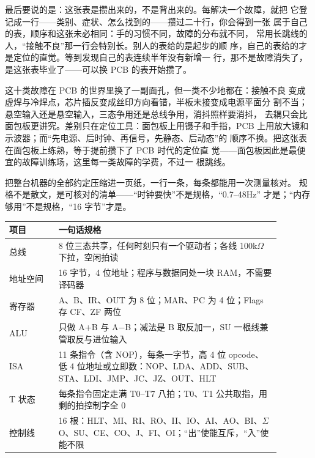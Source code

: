 最后要说的是：这张表是攒出来的，不是背出来的。每解决一个故障，就把
它登记成一行——类别、症状、怎么找到的——攒过二十行，你会得到一张
属于自己的表，顺序和这张未必相同：手的习惯不同，故障的分布就不同，
常用长跳线的人，“接触不良”那一行会特别长。别人的表给的是起步的顺
序，自己的表给的才是定位的直觉。等到发现自己的表连续半年没有新增一
行，那不是故障消失了，是这张表毕业了——可以换 PCB 的表开始攒了。

这十类故障在 PCB 的世界里换了一副面孔，但一类不少地都在：接触不良
变成虚焊与冷焊点，芯片插反变成丝印方向看错，半板未接变成电源平面分
割不当；悬空输入还是悬空输入，三态争用还是总线争用，消抖照样要消抖，
去耦只会比面包板更讲究。差别只在定位工具：面包板上用镊子和手指，PCB
上用放大镜和示波器；而“先电源、后时钟、再信号，先静态、后动态”的
顺序不换。把这张表在面包板上练熟，等于提前攒下了 PCB 时代的定位直
觉——面包板因此是最便宜的故障训练场，这里每一类故障的学费，不过一
根跳线。

把整台机器的全部约定压缩进一页纸，一行一条，每条都能用一次测量核对。
规格不是散文，是可核对的清单——“时钟要快”不是规格，“0.7--48Hz”
才是；“内存够用”不是规格，“16 字节”才是。

\begin{longtable}{L{0.16\linewidth}L{0.72\linewidth}}
\toprule
项目 & 一句话规格 \\
\midrule
总线 & 8 位三态共享，任何时刻只有一个驱动者；各线 100k$\Omega$ 下拉，空闲拍读  \\\tablerowrule
地址空间 & 16 字节，4 位地址；程序与数据同处一块 RAM，不需要译码器 \\\tablerowrule
寄存器 & A、B、IR、OUT 为 8 位；MAR、PC 为 4 位；Flags 存 CF、ZF 两位 \\\tablerowrule
ALU & 只做 A+B 与 A$-$B；减法是 B 取反加一，SU 一根线兼管取反与进位输入 \\\tablerowrule
ISA & 11 条指令（含 NOP），每条一字节，高 4 位 opcode、低 4 位地址或立即数：NOP、LDA、ADD、SUB、STA、LDI、JMP、JC、JZ、OUT、HLT \\\tablerowrule
T 状态 & 每条指令固定走满 T0--T7 八拍；T0、T1 公共取指，用剩的拍控制字全 0 \\\tablerowrule
控制线 & 16 根：HLT、MI、RI、RO、II、IO、AI、AO、BI、$\Sigma$O、SU、CE、CO、J、FI、OI；“出”使能互斥，“入”使能不限 \\
\bottomrule
\end{longtable}

